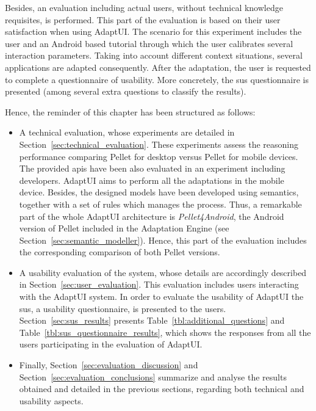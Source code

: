 Besides, an evaluation including actual users, without technical knowledge
requisites, is performed. This part of the evaluation is based on their user
satisfaction when using AdaptUI. The scenario for this experiment includes the
user and an Android based tutorial through which the user calibrates several 
interaction parameters. Taking into account different context situations, several 
applications are adapted consequently. After the adaptation, the user is 
requested to complete a questionnaire of usability. More concretely, the \ac{sus} 
questionnaire is presented (among several extra questions to classify the 
results).

Hence, the reminder of this chapter has been structured as follows: 

\begin{itemize}
  \item A technical evaluation, whose experiments are detailed in 
  Section~\ref{sec:technical_evaluation}. These experiments assess the 
  reasoning performance comparing Pellet for desktop versus Pellet for mobile 
  devices. The provided \acp{api} have been also evaluated in an experiment
  including developers. AdaptUI aims to perform all the adaptations in the
  mobile device. Besides, the designed models have been developed using semantics,
  together with a set of rules which manages the process. Thus, a remarkable
  part of the whole AdaptUI architecture is \textit{Pellet4Android}, the Android
  version of Pellet included in the Adaptation Engine (see Section~\ref{sec:semantic_modeller}).
  Hence, this part of the evaluation includes the corresponding comparison of
  both Pellet versions.
  
  \item A usability evaluation of the system, whose details are accordingly 
  described in Section~\ref{sec:user_evaluation}. This evaluation includes 
  users interacting with the AdaptUI system. In order to evaluate the usability 
  of AdaptUI the \ac{sus}, a usability questionnaire, is presented to the users. 
  Section~\ref{sec:sus_results} presents Table~\ref{tbl:additional_questions} and
  Table~\ref{tbl:sus_questionnaire_results}, which shows the responses from all
  the users participating in the evaluation of AdaptUI.

  \item Finally, Section~\ref{sec:evaluation_discussion} and 
  Section~\ref{sec:evaluation_conclusions} summarize and analyse the results
  obtained and detailed in the previous sections, regarding both technical and
  usability aspects.
\end{itemize}





%

% 

